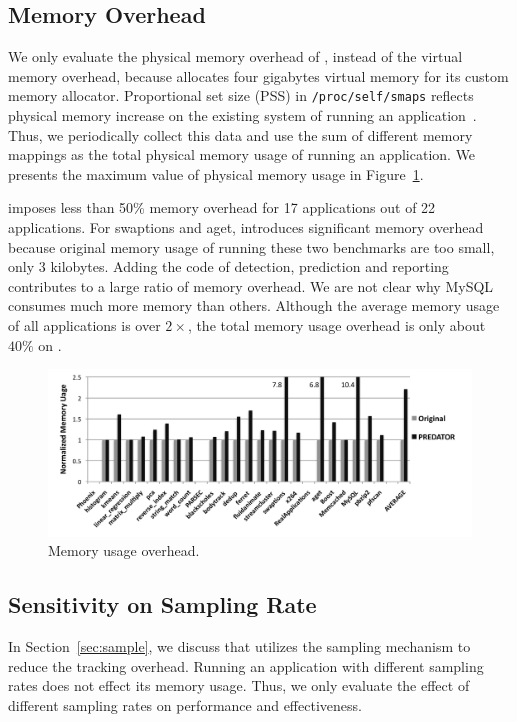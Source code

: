 \subsection{Memory Overhead}
\label{sec:memoverhead}
We only evaluate the physical memory overhead of \Predator{}, instead of the virtual memory overhead, because \Predator{} allocates four gigabytes virtual memory for its custom memory allocator. Proportional set size (PSS) in \texttt{/proc/self/smaps} reflects physical memory increase on the existing system of running an application~\cite{memusage}. Thus, we periodically collect this data and use the sum of different memory mappings as the total physical memory usage of running an application. We presents the maximum value of physical memory usage in Figure~\ref{fig:memusage}. 

\Predator{} imposes less than 50\% memory overhead for 17 applications out of 22 applications.  For swaptions and aget, \Predator{} introduces significant memory overhead because original memory usage of running these two benchmarks are too small, only $3$ kilobytes. Adding the code of detection, prediction and reporting contributes to a large ratio of memory overhead. We are not clear why MySQL consumes much more memory than others. Although the average memory usage of all applications is over $2\times$, the total memory usage overhead is only about $40\%$ on \Predator{}. 

\begin{figure}
\begin{center} 
\includegraphics[width=6.5in]{fig/memusage}
\end{center}
\caption{Memory usage overhead.}
\label{fig:memusage}
\end{figure}


\subsection{Sensitivity on Sampling Rate}
\label{sec:sensitivity}
In Section~\ref{sec:sample}, we discuss that \Predator{} utilizes the sampling mechanism to reduce the tracking overhead. Running an application with different sampling rates does not effect its memory usage. Thus, we only evaluate the effect of different sampling rates on performance and effectiveness. 

